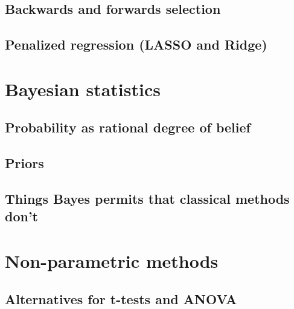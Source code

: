 \documentclass[
  letterpaper,
  DIV=11,
  numbers=noendperiod]{scrreprt}
\begin{document}
\hypertarget{backwards-and-forwards-selection}{%
\subsection{Backwards and forwards
selection}\label{backwards-and-forwards-selection}}

\hypertarget{penalized-regression-lasso-and-ridge}{%
\subsection{Penalized regression (LASSO and
Ridge)}\label{penalized-regression-lasso-and-ridge}}

\hypertarget{bayesian-statistics}{%
\section{Bayesian statistics}\label{bayesian-statistics}}

\hypertarget{probability-as-rational-degree-of-belief}{%
\subsection{Probability as rational degree of
belief}\label{probability-as-rational-degree-of-belief}}

\hypertarget{priors}{%
\subsection{Priors}\label{priors}}

\hypertarget{things-bayes-permits-that-classical-methods-dont}{%
\subsection{Things Bayes permits that classical methods
don't}\label{things-bayes-permits-that-classical-methods-dont}}

\hypertarget{non-parametric-methods}{%
\section{Non-parametric methods}\label{non-parametric-methods}}

\hypertarget{alternatives-for-t-tests-and-anova}{%
\subsection{Alternatives for t-tests and
ANOVA}\label{alternatives-for-t-tests-and-anova}}
\end{document}
